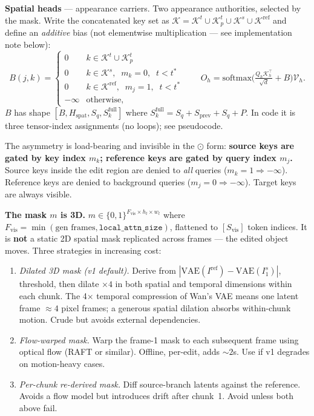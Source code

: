 \documentclass{article}
\begin{document}
\textbf{Spatial heads} --- appearance carriers. Two appearance authorities,
selected by the mask. Write the concatenated key set as
$\mathcal{K} = \mathcal{K}^{t} \cup \mathcal{K}^{t}_{p} \cup \mathcal{K}^{s}
\cup \mathcal{K}^{\mathrm{ref}}$ and define an \emph{additive} bias (not
elementwise multiplication --- see implementation note below):
\[
  B(j, k) =
  \begin{cases}
    0 & k \in \mathcal{K}^{t} \cup \mathcal{K}^{t}_{p} \\
    0 & k \in \mathcal{K}^{s},\;\; m_k = 0,\;\; t < t^{*} \\
    0 & k \in \mathcal{K}^{\mathrm{ref}},\;\; m_j = 1,\;\; t < t^{*} \\
    -\infty & \text{otherwise,}
  \end{cases}
  \qquad
  O_h = \mathrm{softmax}\!\Big(\tfrac{Q_h \mathcal{K}_h^{\top}}{\sqrt d} + B\Big) \mathcal{V}_h .
\]
$B$ has shape $[B, H_{\mathrm{spat}}, S_q, S_k^{\mathrm{full}}]$ where
$S_k^{\mathrm{full}} = S_q + S_{\mathrm{prev}} + S_q + P$. In code it is three
tensor-index assignments (no loops); see pseudocode.

The asymmetry is load-bearing and invisible in the $\odot$ form:
\textbf{source keys are gated by key index $m_k$; reference keys are gated by
query index $m_j$.} Source keys inside the edit region are denied to
\emph{all} queries ($m_k=1 \Rightarrow -\infty$). Reference keys are denied to
background queries ($m_j=0 \Rightarrow -\infty$). Target keys are always
visible.

\textbf{The mask $m$ is 3D.} $m \in \{0,1\}^{F_{\mathrm{vis}} \times h_l \times w_l}$
where $F_{\mathrm{vis}} = \min(\text{gen frames}, \texttt{local\_attn\_size})$,
flattened to $[S_{\mathrm{vis}}]$ token indices. It is \textbf{not} a static 2D
spatial mask
replicated across frames --- the edited object moves. Three strategies in
increasing cost:
\begin{enumerate}
  \item \emph{Dilated 3D mask (v1 default).} Derive from
        $|\mathrm{VAE}(I^{\mathrm{ref}}) - \mathrm{VAE}(I^{s}_1)|$, threshold,
        then dilate $\times 4$ in both spatial and temporal dimensions within
        each chunk. The 4$\times$ temporal compression of Wan's VAE means one
        latent frame $\approx 4$ pixel frames; a generous spatial dilation absorbs
        within-chunk motion. Crude but avoids external dependencies.
  \item \emph{Flow-warped mask.} Warp the frame-1 mask to each subsequent frame
        using optical flow (RAFT or similar). Offline, per-edit, adds $\sim 2$s.
        Use if v1 degrades on motion-heavy cases.
  \item \emph{Per-chunk re-derived mask.} Diff source-branch latents against the
        reference. Avoids a flow model but introduces drift after chunk~1.
        Avoid unless both above fail.
\end{enumerate}
\end{document}
